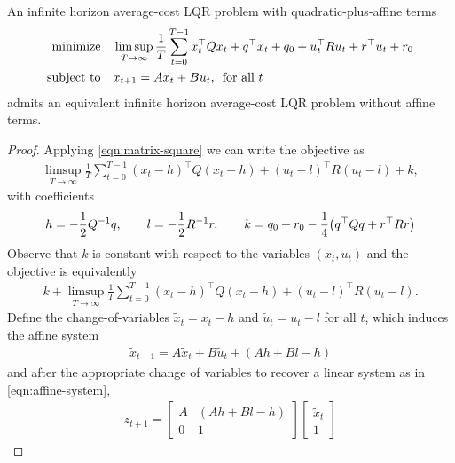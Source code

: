 \documentclass[12pt]{article}
\begin{document}
\begin{theorem}
  \label{thm:affine-lqr}
  An infinite horizon average-cost LQR problem with
  quadratic-plus-affine terms
  \begin{align*}
    \text{minimize}
      &\quad \limsup_{T \to \infty} \frac{1}{T}
        \sum_{t = 0}^{T - 1}
          x_t ^\top Q x_t + q^\top x_t + q_0
          + u_t ^\top R u_t + r^\top u_t + r_0 \\
    \text{subject to}
      &\quad x_{t + 1} = A x_t + B u_t, \enskip \text{for all \(t\)}
  \end{align*}
  admits an equivalent infinite horizon average-cost LQR problem
  without affine terms.
\end{theorem}
\begin{proof}
  Applying \eqref{eqn:matrix-square} we can write the objective as
  \begin{align*}
    \limsup_{T \to \infty}
    \frac{1}{T} \sum_{t = 0}^{T - 1}
      (x_t - h) ^\top Q (x_t - h)
      + (u_t - l)^\top R (u_t - l) + k,
  \end{align*}
  with coefficients
  \begin{align*}
    h = - \frac{1}{2} Q^{-1} q,
    \qquad l = - \frac{1}{2} R^{-1} r,
    \qquad k = q_0 + r_0 - \frac{1}{4} {\left(q^\top Q q + r^\top R r\right)}
  \end{align*}
  Observe that \(k\) is constant with respect to the variables
  \((x_t, u_t)\) and the objective is equivalently
  \begin{align*}
    k + \limsup_{T \to \infty} \frac{1}{T} \sum_{t = 0}^{T - 1}
      (x_t - h)^\top Q (x_t - h) + (u_t - l)^\top R (u_t - l).
  \end{align*}
  Define the change-of-variables
  \(\tilde{x}_t = x_t - h\) and \(\tilde{u}_t = u_t - l\) for all \(t\),
  which induces the affine system
  \begin{align*}
    \tilde{x}_{t + 1} = A \tilde{x}_t + B \tilde{u}_t + (A h + B l - h)
  \end{align*}
  and after the appropriate change of variables to recover a linear system
  as in \eqref{eqn:affine-system},
  \begin{align*}
    z_{t + 1}
      = \begin{bmatrix} A & (Ah + Bl - h) \\ 0 & 1 \end{bmatrix}
        \begin{bmatrix} \tilde{x}_t \\ 1 \end{bmatrix}

\end{align*}
\end{proof}
\end{document}
